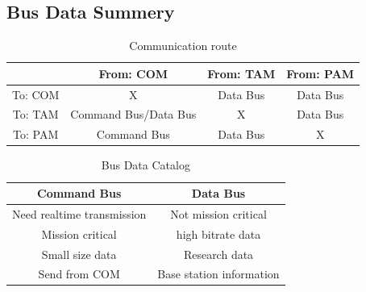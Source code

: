 \documentclass[12pt,article]{memoir}
\begin{document}
\subsection{Bus Data Summery}
\begin{table}[H]
	\centering
		\begin{tabu}{ c | c | c | c }
		& From: COM & From: TAM & From: PAM \\ \hline
		To: COM & X & Data Bus & Data Bus \\ \hline
		To: TAM & Command Bus/Data Bus & X & Data Bus \\ \hline
		To: PAM & Command Bus & Data Bus & X \\ \hline
		\end{tabu}
	\caption{Communication route}
	\label{tab:socs}
\end{table}
\begin{table}[H]
	\centering
		\begin{tabu}{ c | c }
		Command Bus & Data Bus\\ \hline
		Need realtime transmission & Not mission critical\\
		Mission critical & high bitrate data\\
		Small size data & Research data\\
		Send from COM & Base station information\\
		\end{tabu}
	\caption{Bus Data Catalog}
	\label{tab:socs}
\end{table}
\clearpage
\end{document}
